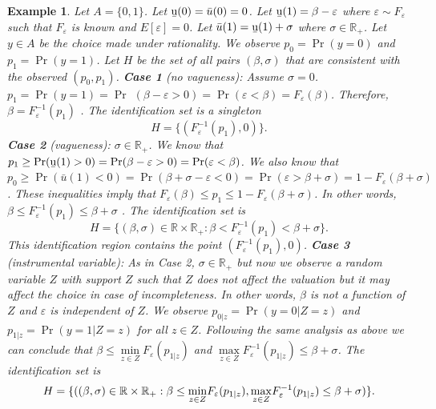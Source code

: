 \documentclass[reqno]{article}
\newtheorem{example}{Example}
\begin{document}
\begin{example}
Let $A=\{0,1\}$. Let $\text{\b{u}}(0)=\bar{u}(0)=0$. Let $\text{\b{u}}(1)=\beta -\varepsilon$ where $\varepsilon \sim F_{\varepsilon }$ such that $F_{\varepsilon }$ is known and $E[\varepsilon ]=0$. Let $\bar{u}(1)=\text{\b{u}}(1)+\sigma $ where $\sigma \in \mathbb{R}_{+}$. Let $y\in A$ be the choice made under rationality. We observe $p_{0}=\Pr (y=0)$ and $p_{1}=\Pr (y=1)$. Let $H$ be the set of all pairs $
(\beta ,\sigma )$ that are consistent with the observed $(p_{0},p_{1})$. 
\newline
\relax\textbf{Case 1} (no vagueness): Assume $\sigma =0$. $p_{1}=\Pr
(y=1)=\Pr $ $(\beta -\varepsilon >0)=\Pr (\varepsilon <\beta
)=F_{\varepsilon }(\beta )$. Therefore, $\beta =F_{\varepsilon }^{-1}(p_{1})$%
. The identification set is a singleton 
\begin{equation*}
H=\{(F_{\varepsilon }^{-1}(p_{1}),0)\}\text{.}
\end{equation*}%
\newline
\relax\textbf{Case 2} (vagueness): $\sigma \in \mathbb{R}_{+}$. We know that $p_{1}\geq \Pr (\text{\b{u}}(1)>0)=\Pr (\beta -\varepsilon
>0)=\Pr (\varepsilon <\beta )$. We also know that $p_{0}\geq \Pr
(\bar{u}(1)<0)=\Pr (\beta +\sigma -\varepsilon <0)=\Pr (\varepsilon >\beta
+\sigma )=1-F_{\varepsilon }(\beta +\sigma )$. These inequalities imply that 
$F_{\varepsilon }(\beta )\leq p_{1}\leq 1-F_{\varepsilon }(\beta +\sigma )$.
In other words, $\beta \leq F_{\varepsilon }^{-1}(p_{1})\leq \beta +\sigma $%
. The identification set is 
\begin{equation*}
H=\{(\beta ,\sigma )\in \mathbb{R} \times \mathbb{R}_{+}:\beta <F_{\varepsilon }^{-1}(p_{1})<\beta +\sigma \}\text{.}
\end{equation*}%
This identification region contains the point $(F_{\varepsilon
}^{-1}(p_{1}),0)$. \newline
\relax\textbf{Case 3} (instrumental variable): As in Case 2, $\sigma \in \mathbb{R}_{+}$ but now we observe a random variable $Z$ with support $Z$ such that $Z$
does not affect the valuation but it may affect the choice in case of
incompleteness. In other words, $\beta $ is not a function of $Z$ and $%
\varepsilon $ is independent of $Z$. We observe $p_{0|z}=\Pr (y=0|Z=z)$ and $%
p_{1|z}=\Pr (y=1|Z=z)$ for all $z\in Z$. Following the same analysis as
above we can conclude that $\beta \leq \underset{z\in Z}{\min }%
F_{\varepsilon }(p_{1|z})$ and $\underset{z\in Z}{\max }F_{\varepsilon
}^{-1}(p_{1|z})\leq \beta +\sigma $. The identification set is%
\begin{equation*}
H=\{((\beta ,\sigma )\in \mathbb{R} \times \mathbb{R}_{+}: \beta \leq \underset{z\in Z}{\min }F_{\varepsilon }(p_{1|z}),\underset{%
z\in Z}{\max }F_{\varepsilon }^{-1}(p_{1|z})\leq \beta +\sigma )\}\text{.}
\end{equation*}


\end{example}
\end{document}
